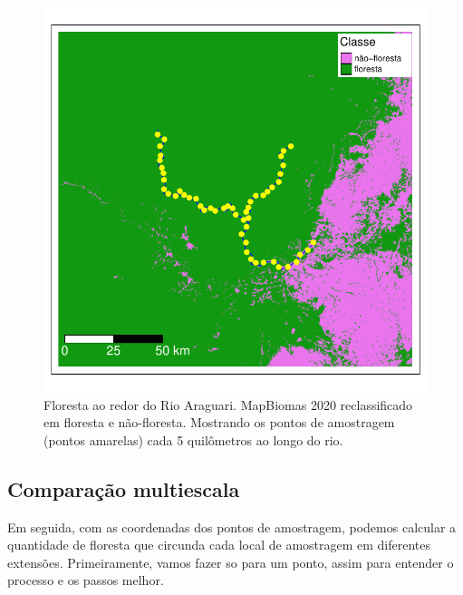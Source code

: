 \documentclass[
]{article}
\begin{document}
\begin{figure}
\centering
\includegraphics{epr_files/figure-latex/unnamed-chunk-12-1.pdf}
\caption{\label{fig:unnamed-chunk-12}Floresta ao redor do Rio Araguari. MapBiomas 2020 reclassificado em floresta e não-floresta. Mostrando os pontos de amostragem (pontos amarelas) cada 5 quilômetros ao longo do rio.}
\end{figure}

\hypertarget{comparauxe7uxe3o-multiescala}{%
\subsection{Comparação multiescala}\label{comparauxe7uxe3o-multiescala}}

Em seguida, com as coordenadas dos pontos de amostragem, podemos calcular a quantidade de floresta que circunda cada local de amostragem em diferentes extensões. Primeiramente, vamos fazer so para um ponto, assim para entender o processo e os passos melhor.
\end{document}
